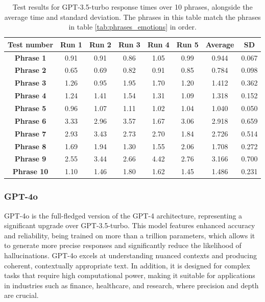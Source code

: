 \begin{table}[h!]
\centering{}
\caption{Test results for GPT-3.5-turbo response times over 10 phrases, alongside the average time and standard deviation. The phrases in this table match the phrases in table \ref{tab:phrases_emotions} in order.}
\begin{tabular}{|c|c|c|c|c|c|c|c|}
\hline
\textbf{Test number} & \textbf{Run 1} & \textbf{Run 2} & \textbf{Run 3} & \textbf{Run 4} & \textbf{Run 5} & \textbf{Average} & \textbf{SD} \\ \hline
\textbf{Phrase 1} & 0.91 & 0.91 & 0.86 & 1.05 & 0.99 & 0.944 & 0.067          \\ \hline
\textbf{Phrase 2} & 0.65 & 0.69 & 0.82 & 0.91 & 0.85 & 0.784 & 0.098          \\ \hline
\textbf{Phrase 3} & 1.26 & 0.95 & 1.95 & 1.70 & 1.20 & 1.412 & 0.362          \\ \hline
\textbf{Phrase 4} & 1.24 & 1.41 & 1.54 & 1.31 & 1.09 & 1.318 & 0.152          \\ \hline
\textbf{Phrase 5} & 0.96 & 1.07 & 1.11 & 1.02 & 1.04 & 1.040 & 0.050          \\ \hline
\textbf{Phrase 6} & 3.33 & 2.96 & 3.57 & 1.67 & 3.06 & 2.918 & 0.659          \\ \hline
\textbf{Phrase 7} & 2.93 & 3.43 & 2.73 & 2.70 & 1.84 & 2.726 & 0.514          \\ \hline
\textbf{Phrase 8} & 1.69 & 1.94 & 1.30 & 1.55 & 2.06 & 1.708 & 0.272          \\ \hline
\textbf{Phrase 9} & 2.55 & 3.44 & 2.66 & 4.42 & 2.76 & 3.166 & 0.700          \\ \hline
\textbf{Phrase 10}& 1.10 & 1.46 & 1.80 & 1.62 & 1.45 & 1.486 & 0.231          \\ \hline
\end{tabular}
\label{tab:phrase_gpt3.5}
\end{table}

\subsubsection{GPT-4o}

GPT-4o is the full-fledged version of the GPT-4 architecture, representing a significant upgrade over GPT-3.5-turbo. This model features enhanced accuracy and reliability, being trained on more than a trillion parameters, which allows it to generate more precise responses and significantly reduce the likelihood of hallucinations. GPT-4o excels at understanding nuanced contexts and producing coherent, contextually appropriate text. In addition, it is designed for complex tasks that require high computational power, making it suitable for applications in industries such as finance, healthcare, and research, where precision and depth are crucial.

